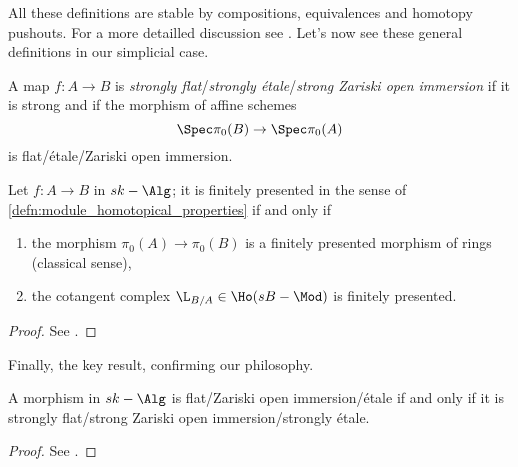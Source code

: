         All these definitions are stable by compositions, equivalences and homotopy pushouts. For a more detailled discussion see \cite[1.2.6]{ToVe:hag2}.
        Let's now see these general definitions in our simplicial case.
        \begin{defn}
            A map $f\colon A \to B$ is \emph{strongly flat}/\emph{strongly étale}/\emph{strong Zariski open immersion} if it is strong and if the morphism of affine schemes \[\Spec \pi_0(B) \to \Spec \pi_0(A) \] is flat/étale/Zariski open immersion.
        \end{defn}
        \begin{prop}
            \label{prop:criterion_finitely_presented}
            Let $f\colon A \to B$ in $sk-\Alg$; it is finitely presented in the sense of \cref{defn:module_homotopical_properties} if and only if 
            \begin{enumerate}
                \item the morphism $\pi_0(A) \to \pi_0(B)$ is a finitely presented morphism of rings (classical sense),
                \item the cotangent complex $\L_{B/A} \in \Ho(sB-\Mod)$ is finitely presented.
            \end{enumerate}
        \end{prop}
        \begin{proof}
            See \cite[Proposition~2.2.2.4]{ToVe:hag2}.
        \end{proof}

        Finally, the key result, confirming our philosophy.
        \begin{thm}
            \label{thm:morphisms_properties}
            A morphism in $sk-\Alg$ is flat/Zariski open immersion/étale if and only if it is strongly flat/strong Zariski open immersion/strongly étale.
        \end{thm}
        \begin{proof}
            See \cite[Theorem~2.2.2.6]{ToVe:hag2}.
        \end{proof}


